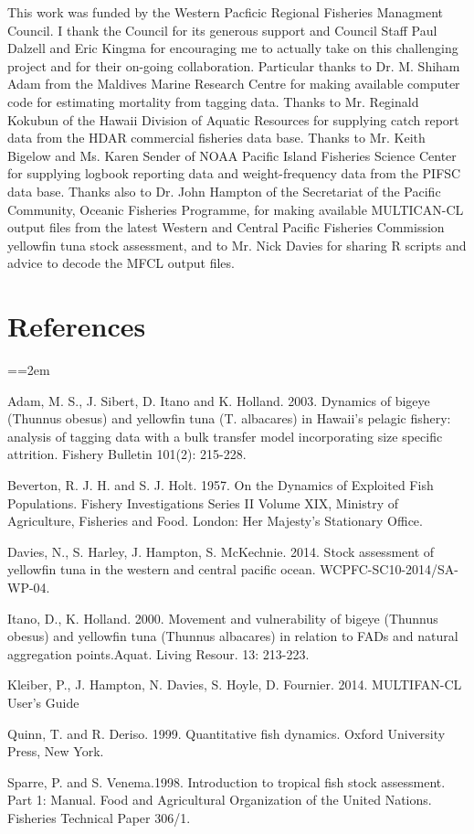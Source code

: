 \documentclass[12pt,letterpaper]{article}
\newcommand\doublespacing{\baselineskip=1.6\normalbaselineskip}
\begin{document}
\vspace{4ex}
This work was funded by the Western Pacficic Regional Fisheries
Managment Council. I thank the Council for its generous support and
Council Staff Paul Dalzell and Eric Kingma for encouraging me to
actually take on this challenging project and for their on-going
collaboration.
Particular thanks to Dr. M. Shiham Adam from the Maldives Marine
Research Centre for making available computer code for estimating
mortality from tagging data.
Thanks to Mr. Reginald Kokubun of the Hawaii Division of Aquatic
Resources for supplying catch report data from the HDAR commercial
fisheries data base.
Thanks to Mr. Keith Bigelow and Ms. Karen Sender of NOAA Pacific
Island Fisheries Science Center for supplying logbook reporting data and
weight-frequency data from the PIFSC data base.
Thanks also to Dr. John Hampton of the Secretariat of the Pacific
Community, Oceanic Fisheries Programme, for making available
MULTICAN-CL output files from the latest Western and Central Pacific
Fisheries Commission yellowfin tuna stock assessment, and to Mr. Nick
Davies for sharing R scripts and advice to decode the MFCL output files.

\section*{References}
{\parindent=0cm \small
\everypar={\hangindent=2em }\par
\doublespacing
Adam, M. S., J. Sibert, D. Itano and K. Holland. 2003. Dynamics of
bigeye (Thunnus obesus) and yellowfin tuna (T. albacares) in Hawaii's
pelagic fishery: analysis of tagging data with a bulk transfer model
incorporating size specific attrition. Fishery Bulletin 101(2):
215-228.

Beverton, R. J. H. and S. J. Holt. 1957. On the Dynamics of Exploited
Fish Populations. Fishery Investigations Series II Volume XIX,
Ministry of Agriculture, Fisheries and Food. London: Her Majesty's
Stationary Office.

Davies, N., S. Harley, J. Hampton, S. McKechnie. 2014. Stock
assessment of yellowfin tuna in the western and central pacific ocean.
WCPFC-SC10-2014/SA-WP-04.

Itano, D., K. Holland. 2000.  Movement and vulnerability of bigeye
(Thunnus obesus) and yellowfin tuna (Thunnus albacares) in relation to
FADs and natural aggregation points.Aquat. Living Resour. 13: 213-223.

Kleiber, P., J. Hampton, N. Davies, S. Hoyle, D. Fournier. 2014.
MULTIFAN-CL User’s Guide

Quinn, T. and R. Deriso. 1999. Quantitative fish dynamics. Oxford
University Press, New York.

Sparre, P. and S. Venema.1998. Introduction to tropical fish stock
assessment. Part 1: Manual. Food and Agricultural Organization of the
United Nations. Fisheries Technical Paper 306/1.
\par}
\end{document}
